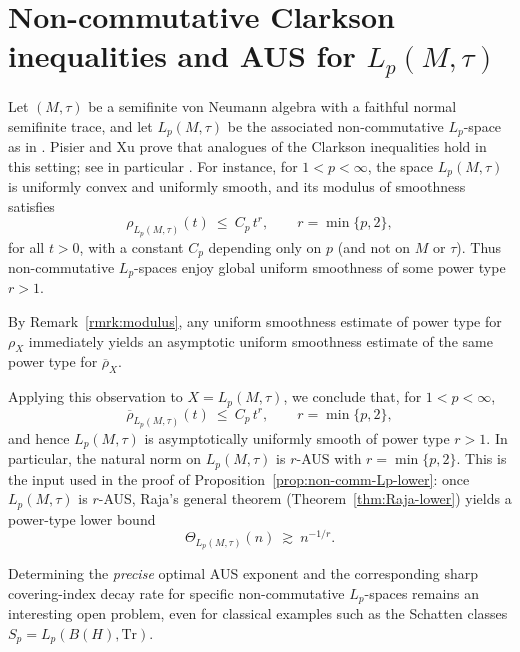\documentclass[reqno,11pt]{amsart}
\theoremstyle{plain}
\theoremstyle{definition}
\theoremstyle{remark}
\renewcommand{\le}{\leqslant}
\begin{document}
\appendix

\section{Non-commutative Clarkson inequalities and AUS for $L_p(M,\tau)$}

Let $(M,\tau)$ be a semifinite von Neumann algebra with a faithful normal
semifinite trace, and let $L_p(M,\tau)$ be the associated non-commutative
$L_p$-space as in \cite{PisierXu}.  Pisier and Xu prove that analogues of
the Clarkson inequalities hold in this setting; see in particular
\cite[Section~34.5]{PisierXu}.  For instance, for $1<p<\infty$, the space
$L_p(M,\tau)$ is uniformly convex and uniformly smooth, and its modulus of
smoothness satisfies
\[
   \rho_{L_p(M,\tau)}(t)\ \le\ C_p\,t^{r},
   \qquad r=\min\{p,2\},
\]
for all $t>0$, with a constant $C_p$ depending only on $p$ (and not on
$M$ or $\tau$).  Thus non-commutative $L_p$-spaces enjoy global uniform
smoothness of some power type $r>1$.

By Remark~\ref{rmrk:modulus}, any uniform smoothness estimate of power type for $\rho_X$ immediately yields an asymptotic uniform smoothness estimate of the same power type for $\overline{\rho}_X$.

Applying this observation to $X=L_p(M,\tau)$, we conclude that, for $1<p<\infty$,
\[
\overline{\rho}_{L_p(M,\tau)}(t)\ \le\ C_p\,t^{r},
\qquad r=\min\{p,2\},
\]
and hence $L_p(M,\tau)$ is asymptotically uniformly smooth of power type $r>1$.  In particular, the natural norm on $L_p(M,\tau)$ is $r$-AUS with $r=\min\{p,2\}$.  This is the input used in the proof of Proposition~\ref{prop:non-comm-Lp-lower}: once $L_p(M,\tau)$ is $r$-AUS, Raja's general theorem (Theorem~\ref{thm:Raja-lower}) yields a power-type lower bound
\[
\Theta_{L_p(M,\tau)}(n)\ \gtrsim\ n^{-1/r}.
\]

Determining the \emph{precise} optimal AUS exponent and the corresponding sharp covering-index decay rate for specific non-commutative $L_p$-spaces remains an interesting open problem, even for classical examples such as the Schatten classes $S_p=L_p(B(H),\mathrm{Tr})$.
\end{document}
